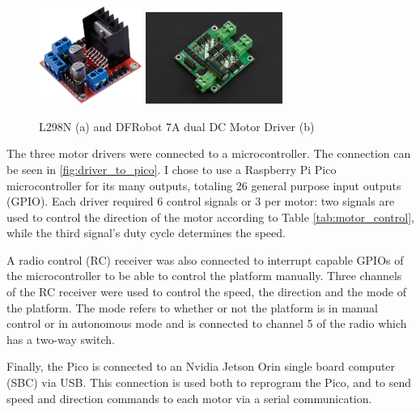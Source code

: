 \documentclass[11pt]{article}
\begin{document}
            
            \begin{figure}[h]
                \centering
                \includegraphics[width=0.3\textwidth]{Images/olddrivers.jpg}
                \includegraphics[width=0.4\textwidth]{Images/newdrivers.jpg}
                \caption{L298N (a) and DFRobot 7A dual DC Motor Driver (b)}
                \label{fig:drivers_comparison}
            \end{figure}

            The three motor drivers were connected to a microcontroller. The connection can be seen in \ref{fig:driver_to_pico}.
            I chose to use a Raspberry Pi Pico microcontroller for its many outputs, totaling 26 general purpose input outputs (GPIO). Each driver required 6 control signals or 3 per motor: two signals are used to control the direction of the motor according to Table \ref{tab:motor_control}, while the third signal's duty cycle determines the speed.

            A radio control (RC) receiver was also connected to interrupt capable GPIOs of the microcontroller to be able to control the platform manually. Three channels of the RC receiver were used to control the speed, the direction and the mode of the platform. The mode refers to whether or not the platform is in manual control or in autonomous mode and is connected to channel 5 of the radio which has a two-way switch.

            Finally, the Pico is connected to an Nvidia Jetson Orin single board computer (SBC) via USB. This connection is used both to reprogram the Pico, and to send speed and direction commands to each motor via a serial communication. 
\end{document}
